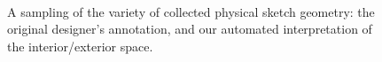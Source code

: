 \begin{figure}[p]
%
\vspace{-0.3in}
\\
\caption{A sampling of the variety of collected physical sketch
  geometry: the original designer's annotation, and our automated
  interpretation of the interior/exterior space.}
\label{figure:lotsofdesigns}
\end{figure}
